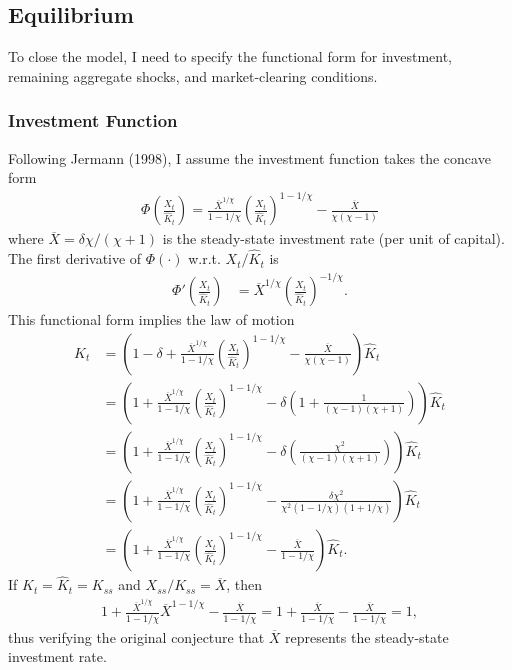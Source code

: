 \documentclass[12 pt, oneside]{article}
\theoremstyle{definition}
\theoremstyle{definition}
\theoremstyle{definition}
\begin{document}
\subsection{Equilibrium}
To close the model, I need to specify the functional form for investment, remaining aggregate shocks, and market-clearing conditions.\\

\subsubsection{Investment Function}
Following Jermann (1998), I assume the investment function takes the concave form
\begin{align}\label{eq:invst fnct}
  \Phi\left(\frac{X_t}{\hat{K}_t}\right) = \frac{\overline{X}^{1/\chi}}{1 - 1/\chi}\left(\frac{X_t}{\hat{K}_t}\right)^{1 - 1/\chi} - \frac{\overline{X}}{\chi(\chi - 1)}
\end{align}
where $\overline{X} = \delta \chi / (\chi + 1)$ is the steady-state investment rate (per unit of capital). The first derivative of $\Phi(\cdot)$ w.r.t. $X_t / \hat{K}_t$ is
\begin{align}\label{eq:invst fnct first deriv}
    \Phi'\left(\frac{X_t}{\hat{K}_t}\right) & = \overline{X}^{1/\chi}\left(\frac{X_t}{ \hat{K}_t}\right)^{-1/\chi}.
\end{align}
This functional form implies the law of motion
\begin{align*}
  K_t & = \left(1 - \delta + \frac{\overline{X}^{1/\chi}}{1 - 1/\chi}\left(\frac{X_t}{\hat{K}_t}\right)^{1 - 1/\chi} - \frac{\overline{X}}{\chi(\chi - 1)}\right)\hat{K}_t\\
      & = \left(1 + \frac{\overline{X}^{1/\chi}}{1 - 1/\chi}\left(\frac{X_t}{\hat{K}_t}\right)^{1 - 1/\chi} -\delta \left(1 +  \frac{1}{(\chi - 1)(\chi + 1)}\right)\right)\hat{K}_t\\
      & = \left(1 + \frac{\overline{X}^{1/\chi}}{1 - 1/\chi}\left(\frac{X_t}{\hat{K}_t}\right)^{1 - 1/\chi} -\delta \left(\frac{\chi^2}{(\chi - 1)(\chi + 1)}\right)\right)\hat{K}_t\\
      & = \left(1 + \frac{\overline{X}^{1/\chi}}{1 - 1/\chi}\left(\frac{X_t}{\hat{K}_t}\right)^{1 - 1/\chi} -\frac{\delta\chi^2}{\chi^2(1 - 1 / \chi)(1 + 1 / \chi)}\right)\hat{K}_t\\
      & = \left(1 + \frac{\overline{X}^{1/\chi}}{1 - 1/\chi}\left(\frac{X_t}{\hat{K}_t}\right)^{1 - 1/\chi} -\frac{\overline{X}}{1 - 1 / \chi}\right)\hat{K}_t.
\end{align*}
If $K_t = \hat{K}_t = K_{ss}$ and $X_{ss} / K_{ss} = \overline{X}$, then
\begin{align*}
  1 + \frac{\overline{X}^{1 / \chi}}{1 - 1 / \chi}\overline{X}^{1 - 1 / \chi} - \frac{\overline{X}}{1 - 1 / \chi} =   1 + \frac{\overline{X}}{1 - 1 / \chi} - \frac{\overline{X}}{1 - 1 / \chi} = 1,
\end{align*}
thus verifying the original conjecture that $\overline{X}$ represents the steady-state investment rate.
\end{document}
